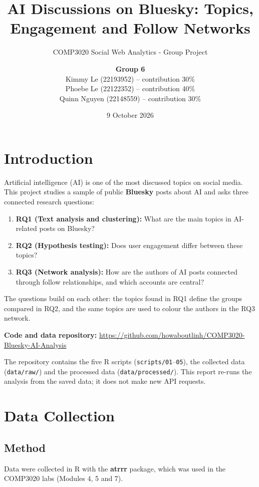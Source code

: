 \documentclass[
  10pt,
]{article}
\title{AI Discussions on Bluesky: Topics, Engagement and Follow
Networks}
\subtitle{COMP3020 Social Web Analytics - Group Project}
\author{\textbf{Group 6}\\
Kimmy Le (22193952) -- contribution 30\%\\
Phoebe Le (22122352) -- contribution 40\%\\
Quinn Nguyen (22148559) -- contribution 30\%}
\date{9 October 2026}
\providecommand{\tightlist}{%
  \setlength{\itemsep}{0pt}\setlength{\parskip}{0pt}}
\begin{document}
\maketitle

{
\setcounter{tocdepth}{2}
\tableofcontents
}
\section{Introduction}\label{introduction}

Artificial intelligence (AI) is one of the most discussed topics on
social media. This project studies a sample of public \textbf{Bluesky}
posts about AI and asks three connected research questions:

\begin{enumerate}
\def\labelenumi{\arabic{enumi}.}
\tightlist
\item
  \textbf{RQ1 (Text analysis and clustering):} What are the main topics
  in AI-related posts on Bluesky?
\item
  \textbf{RQ2 (Hypothesis testing):} Does user engagement differ between
  these topics?
\item
  \textbf{RQ3 (Network analysis):} How are the authors of AI posts
  connected through follow relationships, and which accounts are
  central?
\end{enumerate}

The questions build on each other: the topics found in RQ1 define the
groups compared in RQ2, and the same topics are used to colour the
authors in the RQ3 network.

\textbf{Code and data repository:}
\url{https://github.com/howaboutlinh/COMP3020-Bluesky-AI-Analysis}

The repository contains the five R scripts
(\texttt{scripts/01}--\texttt{05}), the collected data
(\texttt{data/raw/}) and the processed data (\texttt{data/processed/}).
This report re-runs the analysis from the saved data; it does not make
new API requests.

\section{Data Collection}\label{data-collection}

\subsection{Method}\label{method}

Data were collected in R with the \textbf{atrrr} package, which was used
in the COMP3020 labs (Modules 4, 5 and 7).
\end{document}
